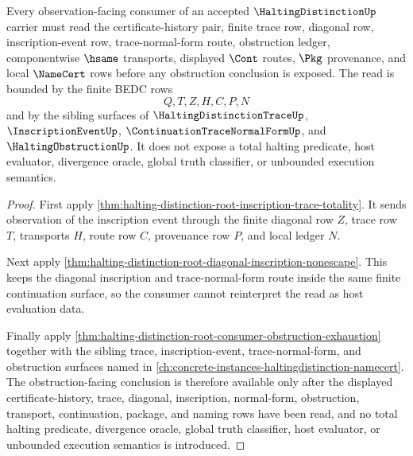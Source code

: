 \begin{theorem}
\label{thm:halting-distinction-observation-boundary}
Every observation-facing consumer of an accepted $\HaltingDistinctionUp$ carrier must read the certificate-history pair, finite trace row, diagonal row, inscription-event row, trace-normal-form route, obstruction ledger, componentwise $\hsame$ transports, displayed $\Cont$ routes, $\Pkg$ provenance, and local $\NameCert$ rows before any obstruction conclusion is exposed. The read is bounded by the finite BEDC rows
$$
Q,T,Z,H,C,P,N
$$
and by the sibling surfaces of $\HaltingDistinctionTraceUp$, $\InscriptionEventUp$, $\ContinuationTraceNormalFormUp$, and $\HaltingObstructionUp$. It does not expose a total halting predicate, host evaluator, divergence oracle, global truth classifier, or unbounded execution semantics.
\end{theorem}
\begin{proof}
First apply \autoref{thm:halting-distinction-root-inscription-trace-totality}. It sends observation of the inscription event through the finite diagonal row $Z$, trace row $T$, transports $H$, route row $C$, provenance row $P$, and local ledger $N$.

Next apply \autoref{thm:halting-distinction-root-diagonal-inscription-nonescape}. This keeps the diagonal inscription and trace-normal-form route inside the same finite continuation surface, so the consumer cannot reinterpret the read as host evaluation data.

Finally apply \autoref{thm:halting-distinction-root-consumer-obstruction-exhaustion} together with the sibling trace, inscription-event, trace-normal-form, and obstruction surfaces named in \autoref{ch:concrete-instances-haltingdistinction-namecert}. The obstruction-facing conclusion is therefore available only after the displayed certificate-history, trace, diagonal, inscription, normal-form, obstruction, transport, continuation, package, and naming rows have been read, and no total halting predicate, divergence oracle, global truth classifier, host evaluator, or unbounded execution semantics is introduced.
\end{proof}
